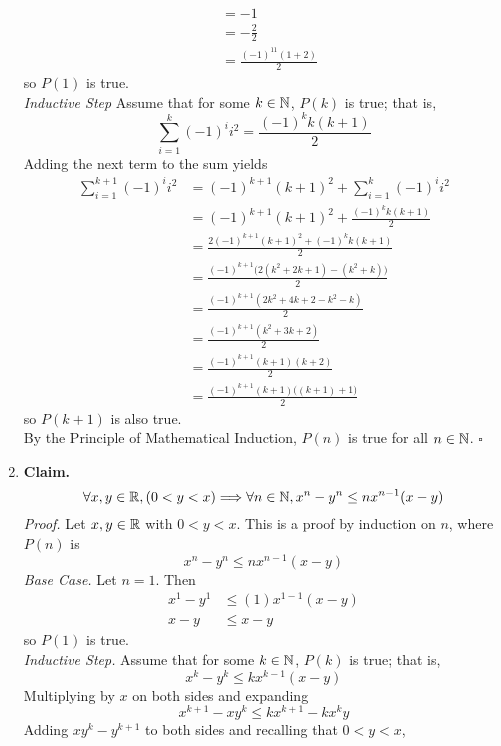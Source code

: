 \documentclass[../MATH135.tex]{subfiles}
\begin{document}
\begin{enumerate}
\begin{align*}
									&= -1 \\
									&= -\frac{2}{2} \\
									&= \frac{(-1)^11(1 + 2)}{2}
							\end{align*}
							so \(P(1)\) is true. \\
					\textit{Inductive Step}
						Assume that for some \(k \in \mathbb{N}\), \(P(k)\) is true; that is,
							\[\sum_{i = 1}^k (-1)^ii^2 = \frac{(-1)^kk(k + 1)}{2}\]
							Adding the next term to the sum yields
							\begin{align*}
								\sum_{i = 1}^{k + 1} (-1)^ii^2 &= (-1)^{k + 1}(k + 1)^2 + \sum_{i = 1}^k(-1)^ii^2 \\
									&= (-1)^{k + 1}(k + 1)^2 + \frac{(-1)^kk(k + 1)}{2} \\
									&= \frac{2(-1)^{k + 1}(k + 1)^2 + (-1)^kk(k + 1)}{2} \\
									&= \frac{(-1)^{k + 1}\bigl(2(k^2 + 2k + 1) - (k^2 + k)\bigr)}{2} \\
									&= \frac{(-1)^{k + 1}(2k^2 + 4k + 2 - k^2 - k)}{2} \\
									&= \frac{(-1)^{k + 1}(k^2 + 3k + 2)}{2} \\
									&= \frac{(-1)^{k + 1}(k + 1)(k + 2)}{2} \\
									&= \frac{(-1)^{k + 1}(k + 1)\bigl((k + 1) + 1)}{2}
							\end{align*}
							so \(P(k + 1)\) is also true. \\
							By the Principle of Mathematical Induction, \(P(n)\) is true for all \(n \in \mathbb{N}\). \(\square\)
			\item
				\textbf{Claim.}
					\[\forall x, y \in \mathbb{R}, (0 < y < x) \Longrightarrow \forall n \in \mathbb{N}, x^n - y^n \le nx^{n - 1}(x - y)\]
				\textit{Proof.}
					Let \(x, y \in \mathbb{R}\) with \(0 < y < x\). This is a proof by induction on \(n\), where \(P(n)\) is
						\[x^n - y^n \le nx^{n - 1}(x - y)\]
					\textit{Base Case.}
						Let \(n = 1\). Then
							\begin{align*}
								x^1 - y^1 &\le (1)x^{1 - 1}(x - y) \\
								x - y &\le x - y
							\end{align*}
							so \(P(1)\) is true. \\
					\textit{Inductive Step.}
						Assume that for some \(k \in \mathbb{N}\), \(P(k)\) is true; that is,
							\[x^k - y^k \le kx^{k - 1}(x - y)\]
							Multiplying by \(x\) on both sides and expanding
							\[x^{k + 1} - xy^k \le kx^{k + 1} - kx^ky\]
							Adding \(xy^k - y^{k + 1}\) to both sides and recalling that \(0 < y < x\),

\end{enumerate}
\end{document}
